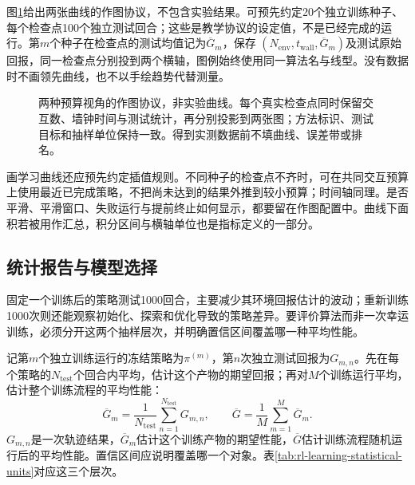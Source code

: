 图\ref{fig:rl-learning-evaluation-protocol}给出两张曲线的作图协议，不包含实验结果。可预先约定20个独立训练种子、每个检查点100个独立测试回合；这些是教学协议的设定值，不是已经完成的运行。第$m$个种子在检查点的测试均值记为$\overline G_m$，保存
$(N_{\mathrm{env}},t_{\mathrm{wall}},\overline G_m)$及测试原始回报，同一检查点分别投到两个横轴，图例始终使用同一算法名与线型。没有数据时不画领先曲线，也不以手绘趋势代替测量。

\begin{figure}[t]
  \centering
  
  \caption{两种预算视角的作图协议，非实验曲线。每个真实检查点同时保留交互数、墙钟时间与测试统计，再分别投影到两张图；方法标识、测试目标和抽样单位保持一致。得到实测数据前不填曲线、误差带或排名。}
  \label{fig:rl-learning-evaluation-protocol}
\end{figure}

画学习曲线还应预先约定插值规则。不同种子的检查点不齐时，可在共同交互预算上使用最近已完成策略，不把尚未达到的结果外推到较小预算；时间轴同理。是否平滑、平滑窗口、失败运行与提前终止如何显示，都要留在作图配置中。曲线下面积若被用作汇总，积分区间与横轴单位也是指标定义的一部分。

\subsection{统计报告与模型选择}
\label{sec:rl-learning-statistical-report}

固定一个训练后的策略测试1000回合，主要减少其环境回报估计的波动；重新训练1000次则还能观察初始化、探索和优化导致的策略差异。要评价算法而非一次幸运训练，必须分开这两个抽样层次，并明确置信区间覆盖哪一种平均性能。

记第$m$个独立训练运行的冻结策略为$\pi^{(m)}$，第$n$次独立测试回报为$G_{m,n}$。先在每个策略的$N_{\mathrm{test}}$个回合内平均，估计这个产物的期望回报；再对$M$个训练运行平均，估计整个训练流程的平均性能：
\[
 \overline G_m=\frac1{N_{\mathrm{test}}}
                    \sum_{n=1}^{N_{\mathrm{test}}}G_{m,n},\qquad
 \overline G=\frac1M\sum_{m=1}^{M}\overline G_m .
\]
$G_{m,n}$是一次轨迹结果，$\overline G_m$估计这个训练产物的期望性能，$\overline G$估计训练流程随机运行后的平均性能。置信区间应说明覆盖哪一个对象。表\ref{tab:rl-learning-statistical-units}对应这三个层次。


